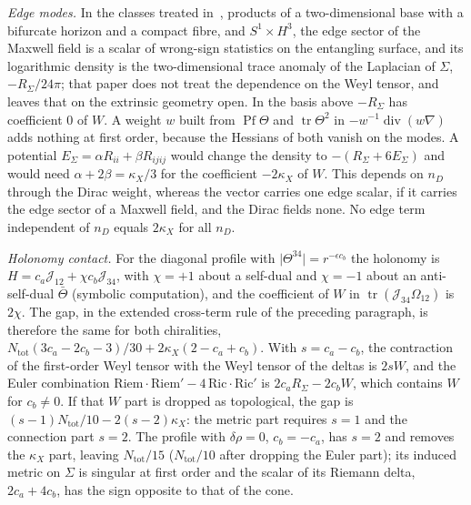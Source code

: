 \emph{Edge modes.} In the classes treated in~\cite{DonnellyWall2016}, products of a two-dimensional base with a bifurcate horizon and a compact fibre, and \(S^1\times H^3\), the edge sector of the Maxwell field is a scalar of wrong-sign statistics on the entangling surface, and its logarithmic density is the two-dimensional trace anomaly of the Laplacian of \(\Sigma\), \(-R_\Sigma/24\pi\); that paper does not treat the dependence on the Weyl tensor, and leaves that on the extrinsic geometry open. In the basis above \(-R_\Sigma\) has coefficient \(0\) of \(W\). A weight \(w\) built from \(\operatorname{Pf}\Theta\) and \(\operatorname{tr}\Theta^2\) in \(-w^{-1}\operatorname{div}(w\nabla)\) adds nothing at first order, because the Hessians of both vanish on the modes. A potential \(E_\Sigma=\alpha R_{ii}+\beta R_{ijij}\) would change the density to \(-(R_\Sigma+6E_\Sigma)\) and would need \(\alpha+2\beta=\kappa_X/3\) for the coefficient \(-2\kappa_X\) of \(W\). This depends on \(n_D\) through the Dirac weight, whereas the vector carries one edge scalar, if it carries the edge sector of a Maxwell field, and the Dirac fields none. No edge term independent of \(n_D\) equals \(2\kappa_X\) for all \(n_D\).

\emph{Holonomy contact.} For the diagonal profile with \(\lvert\Theta^{34}\rvert=r^{-\epsilon c_b}\) the holonomy is \(H=c_a\mathcal J_{12}+\chi c_b\mathcal J_{34}\), with \(\chi=+1\) about a self-dual and \(\chi=-1\) about an anti-self-dual \(\bar\Theta\) (symbolic computation), and the coefficient of \(W\) in \(\operatorname{tr}(\mathcal J_{34}\Omega_{12})\) is \(2\chi\). The gap, in the extended cross-term rule of the preceding paragraph, is therefore the same for both chiralities, \(N_{\mathrm{tot}}(3c_a-2c_b-3)/30+2\kappa_X(2-c_a+c_b)\). With \(s=c_a-c_b\), the contraction of the first-order Weyl tensor with the Weyl tensor of the deltas is \(2sW\), and the Euler combination \(\mathrm{Riem}\cdot\mathrm{Riem}'-4\,\mathrm{Ric}\cdot\mathrm{Ric}'\) is \(2c_aR_\Sigma-2c_bW\), which contains \(W\) for \(c_b\neq0\). If that \(W\) part is dropped as topological, the gap is \((s-1)N_{\mathrm{tot}}/10-2(s-2)\kappa_X\): the metric part requires \(s=1\) and the connection part \(s=2\). The profile with \(\delta\rho=0\), \(c_b=-c_a\), has \(s=2\) and removes the \(\kappa_X\) part, leaving \(N_{\mathrm{tot}}/15\) (\(N_{\mathrm{tot}}/10\) after dropping the Euler part); its induced metric on \(\Sigma\) is singular at first order and the scalar of its Riemann delta, \(2c_a+4c_b\), has the sign opposite to that of the cone.

